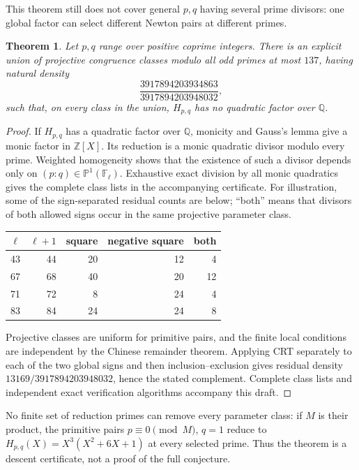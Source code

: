 \documentclass[11pt]{article}
\newtheorem{theorem}{Theorem}
\begin{document}
This theorem still does not cover general $p,q$ having several prime
divisors: one global factor can select different Newton pairs at different
primes.

\begin{theorem}
Let $p,q$ range over positive coprime integers.  There is an explicit union of
projective congruence classes modulo all odd primes at most $137$, having natural
density
\[
\frac{3917894203934863}{3917894203948032},
\]
such that, on every class in the union,
$H_{p,q}$ has no quadratic factor over $\mathbb Q$.
\end{theorem}

\begin{proof}
If $H_{p,q}$ has a quadratic factor over $\mathbb Q$, monicity and Gauss's
lemma give a monic factor in $\mathbb Z[X]$.  Its reduction is a monic
quadratic divisor modulo every prime.  Weighted homogeneity shows that the
existence of such a divisor depends only on $(p:q)\in\mathbb P^1(\mathbb F_\ell)$.
Exhaustive exact division by all monic quadratics gives the complete class
lists in the accompanying certificate.  For illustration, some of the
sign-separated residual counts are below; ``both'' means that divisors of
both allowed signs occur in the same projective parameter class.

\begin{center}
\begin{tabular}{rrrrr}
\toprule
$\ell$ & $\ell+1$ & square & negative square & both\\
\midrule
43&44&20&12&4\\
67&68&40&20&12\\
71&72&8&24&4\\
83&84&24&24&8\\
\bottomrule
\end{tabular}
\end{center}

Projective classes are uniform for primitive pairs, and the finite local
conditions are independent by the Chinese remainder theorem.  Applying CRT
separately to each of the two global signs and then inclusion--exclusion gives
residual density
$13169/3917894203948032$, hence the stated complement.  Complete class lists and
independent exact verification algorithms accompany this draft.
\end{proof}

No finite set of reduction primes can remove every parameter class: if $M$ is
their product, the primitive pairs $p\equiv0\pmod M$, $q=1$ reduce to
$H_{p,q}(X)=X^3(X^2+6X+1)$ at every selected prime.  Thus the theorem is a
descent certificate, not a proof of the full conjecture.
\end{document}
